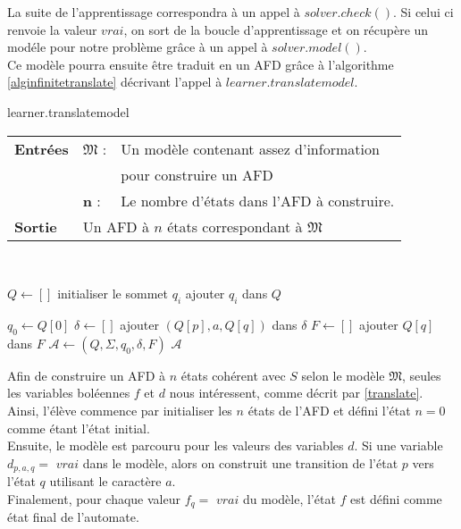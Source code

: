 \documentclass[12pt,a4paper,oneside,titlepage]{report}
\begin{document}
La suite de l'apprentissage correspondra à un appel à $solver.check()$. Si celui ci renvoie la valeur $vrai$, on sort de la boucle d'apprentissage et on récupère un modéle pour notre problème grâce à un appel à $solver.model()$.\\

\noindent Ce modèle pourra ensuite être traduit en un AFD grâce à l'algorithme \ref{alginfinitetranslate} décrivant l'appel à $learner.translatemodel$.

\begin{algorithm}[H]
\caption{learner.translatemodel}\label{alginfinitetranslate}
\hspace*{\algorithmicindent} 
\begin{tabular}{lll}
	\textbf{Entrées} & \textbf{$\mathfrak{M}$} : &Un modèle contenant assez d'information\\
	&&pour construire un AFD\\
	&\textbf{n} :&Le nombre d'états dans l'AFD à construire.\\
	\textbf{Sortie} &\multicolumn{2}{l}{Un AFD à $n$ états correspondant à $\mathfrak{M}$}\\
\end{tabular}\\
\begin{algorithmic}[1]
\State $Q\gets[]$
	\State initialiser le sommet $q_i$
	\State ajouter $q_i$ dans $Q$
\EndFor
{}
\end{algorithmic}
\end{algorithm}

\begin{algorithm}[H]
\begin{algorithmic}[1]
\State $q_0\gets Q[0]$
\State $\delta\gets[]$
		\State ajouter $(Q[p],a,Q[q])$ dans $\delta$
	\EndIf
\EndFor
\State $F\gets[]$
		\State ajouter $Q[q]$ dans $F$
	\EndIf
\EndFor
\State $\mathcal{A}\gets(Q,\Sigma,q_0,\delta,F)$
\State\Return $\mathcal{A}$
\end{algorithmic}
\end{algorithm}
\noindent Afin de construire un AFD à $n$ états cohérent avec $S$ selon le modèle $\mathfrak{M}$, seules les variables boléennes $f$ et $d$ nous intéressent, comme décrit par \ref{translate}. Ainsi, l'élève commence par initialiser les $n$ états de l'AFD et défini l'état $n=0$ comme étant l'état initial.\\
Ensuite, le modèle est parcouru pour les valeurs des variables $d$. Si une variable $d_{p,a,q}=$ $vrai$ dans le modèle, alors on construit une transition de l'état $p$ vers l'état $q$ utilisant le caractère $a$.\\
Finalement, pour chaque valeur $f_{q}=$ $vrai$ du modèle, l'état $f$ est défini comme état final de l'automate.\\
\end{document}
